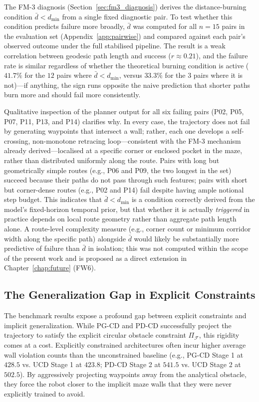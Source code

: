 \documentclass[12pt, a4paper, oneside]{report}
\theoremstyle{definition}
\begin{document}
The FM-3 diagnosis (Section~\ref{sec:fm3_diagnosis}) derives the
distance-burning condition $\bar{d} < d_{\min}$ from a single fixed
diagnostic pair. To test whether this condition predicts failure
more broadly, $\bar{d}$ was computed for all $n=15$ pairs in the
evaluation set (Appendix~\ref{app:pairwise}) and compared against
each pair's observed outcome under the full stabilised pipeline.
The result is a weak correlation between geodesic path length and
success ($r \approx 0.21$), and the failure rate is similar
regardless of whether the theoretical burning condition is active
($41.7\%$ for the $12$ pairs where $\bar{d} < d_{\min}$, versus
$33.3\%$ for the $3$ pairs where it is not)---if anything, the sign
runs opposite the naive prediction that shorter paths burn more and
should fail more consistently.

Qualitative inspection of the planner output for all six failing
pairs (P02, P05, P07, P11, P13, and P14) clarifies why. In every
case, the trajectory does not fail by generating waypoints that
intersect a wall; rather, each one develops a self-crossing,
non-monotone retracing loop---consistent with the FM-3 mechanism
already derived---localised at a specific corner or enclosed pocket
in the maze, rather than distributed uniformly along the route.
Pairs with long but geometrically simple routes (e.g., P06 and P09,
the two longest in the set) succeed because their paths do not pass
through such features; pairs with short but corner-dense routes
(e.g., P02 and P14) fail despite having ample notional step budget.
This indicates that $\bar{d} < d_{\min}$ is a condition correctly
derived from the model's fixed-horizon temporal prior, but that
whether it is actually \emph{triggered} in practice depends on
local route geometry rather than aggregate path length alone. A
route-level complexity measure (e.g., corner count or minimum
corridor width along the specific path) alongside $\bar{d}$ would
likely be substantially more predictive of failure than $\bar{d}$
in isolation; this was not computed within the scope of the present
work and is proposed as a direct extension in
Chapter~\ref{chap:future} (FW6).

\subsection{The Generalization Gap in Explicit Constraints}

The benchmark results expose a profound gap between explicit constraints and implicit generalization. While PG-CD and PD-CD successfully project the trajectory to satisfy the explicit circular obstacle constraint $\Pi_{\mathcal{F}}$, this rigidity comes at a cost. Explicitly constrained architectures often incur higher average wall violation counts than the unconstrained baseline (e.g., PG-CD Stage 1 at $428.5$ vs. UCD Stage 1 at $423.8$; PD-CD Stage 2 at $541.5$ vs. UCD Stage 2 at $502.5$). By aggressively projecting waypoints away from the analytical obstacle, they force the robot closer to the implicit maze walls that they were never explicitly trained to avoid. 
\end{document}
